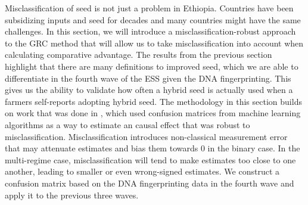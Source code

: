 \documentclass[11pt]{article}
\begin{document}
Misclassification of seed is not just a problem in Ethiopia. Countries have been subsidizing inputs and seed for decades and many countries might have the same challenges. In this section, we will introduce a misclassification-robust approach to the GRC method that will allow us to take misclassification into account when calculating comparative advantage. The results from the previous section highlight that there are many definitions to improved seed, which we are able to differentiate in the fourth wave of the ESS given the DNA fingerprinting. This gives us the ability to validate how often a hybrid seed is actually used when a farmers self-reports adopting hybrid seed. The methodology in this section builds on work that was done in \cite{michuda2021three}, which used confusion matrices from machine learning algorithms as a way to estimate an causal effect that was robust to misclassification. Misclassification introduces non-classical measurement error that may attenuate estimates and bias them towards 0 in the binary case. In the multi-regime case, misclassification will tend to make estimates too close to one another, leading to smaller or even wrong-signed estimates. We construct a confusion matrix based on the DNA fingerprinting data in the fourth wave and apply it to the previous three waves.
\end{document}
